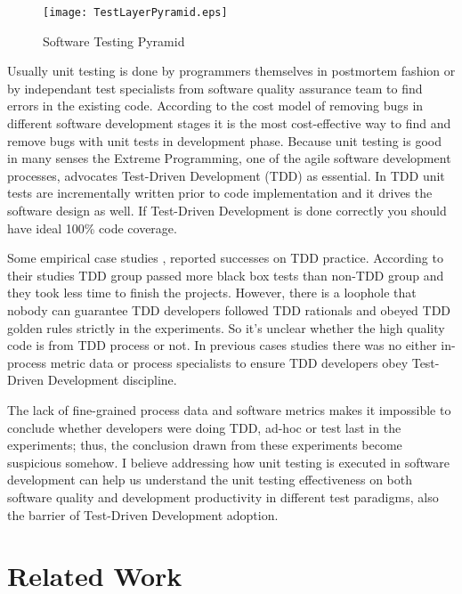 \documentclass[11pt,twocolumn]{article}
\begin{document}
  \begin{figure}[ht] 
    \centering
    \texttt{[image: TestLayerPyramid.eps]}
    \caption{Software Testing Pyramid}\label{fig:TestLayer}
  \end{figure} 
 
  Usually unit testing is done by programmers themselves in postmortem
  fashion or by independant test specialists from software quality
  assurance team to find errors in the existing code. According to the cost
  model of removing bugs in different software development stages it is the
  most cost-effective way to find and remove bugs with unit tests in
  development phase. Because unit testing is good in many senses the Extreme
  Programming, one of the agile software development processes, advocates
  Test-Driven Development (TDD) as essential. In TDD unit tests are
  incrementally written prior to code implementation \cite{George:2003} and
  it drives the software design as well. If Test-Driven Development is done
  correctly you should have ideal 100\% code coverage.
  
  Some empirical case studies \cite{George:2003}, \cite{Maximilien:2003}
  reported successes on TDD practice. According to their studies TDD group
  passed more black box tests than non-TDD group and they took less time to
  finish the projects. However, there is a loophole that nobody can
  guarantee TDD developers followed TDD rationals and obeyed TDD golden
  rules strictly in the experiments. So it's unclear whether the high
  quality code is from TDD process or not. In previous cases studies there
  was no either in-process metric data or process specialists to ensure
  TDD developers obey Test-Driven Development discipline.
  
  The lack of fine-grained process data and software metrics makes it
  impossible to conclude whether developers were doing TDD, ad-hoc or test
  last in the experiments; thus, the conclusion drawn from these
  experiments become suspicious somehow. I believe addressing how unit
  testing is executed in software development can help us understand the unit
  testing effectiveness on both software quality and development
  productivity in different test paradigms, also the barrier of Test-Driven
  Development adoption.

\section{Related Work}
\label{sec:relwork}
\end{document}
